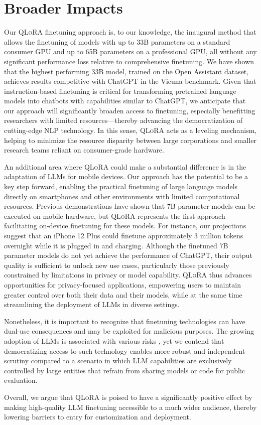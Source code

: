 \section{Broader Impacts}

Our \textsc{QLoRA} finetuning approach is, to our knowledge, the inaugural method that allows the finetuning of models with up to 33B parameters on a standard consumer GPU and up to 65B parameters on a professional GPU, all without any significant performance loss relative to comprehensive finetuning. We have shown that the highest performing 33B model, trained on the Open Assistant dataset, achieves results competitive with ChatGPT in the Vicuna benchmark. Given that instruction-based finetuning is critical for transforming pretrained language models into chatbots with capabilities similar to ChatGPT, we anticipate that our approach will significantly broaden access to finetuning, especially benefitting researchers with limited resources—thereby advancing the democratization of cutting-edge NLP technology. In this sense, \textsc{QLoRA} acts as a leveling mechanism, helping to minimize the resource disparity between large corporations and smaller research teams reliant on consumer-grade hardware.

An additional area where \textsc{QLoRA} could make a substantial difference is in the adaptation of LLMs for mobile devices. Our approach has the potential to be a key step forward, enabling the practical finetuning of large language models directly on smartphones and other environments with limited computational resources. Previous demonstrations have shown that 7B parameter models can be executed on mobile hardware, but \textsc{QLoRA} represents the first approach facilitating on-device finetuning for these models. For instance, our projections suggest that an iPhone 12 Plus could finetune approximately 3 million tokens overnight while it is plugged in and charging. Although the finetuned 7B parameter models do not yet achieve the performance of ChatGPT, their output quality is sufficient to unlock new use cases, particularly those previously constrained by limitations in privacy or model capability. \textsc{QLoRA} thus advances opportunities for privacy-focused applications, empowering users to maintain greater control over both their data and their models, while at the same time streamlining the deployment of LLMs in diverse settings.

Nonetheless, it is important to recognize that finetuning technologies can have dual-use consequences and may be exploited for malicious purposes. The growing adoption of LLMs is associated with various risks \citep{bommasani2021opportunities,bender2021dangers}, yet we contend that democratizing access to such technology enables more robust and independent scrutiny compared to a scenario in which LLM capabilities are exclusively controlled by large entities that refrain from sharing models or code for public evaluation.

Overall, we argue that \textsc{QLoRA} is poised to have a significantly positive effect by making high-quality LLM finetuning accessible to a much wider audience, thereby lowering barriers to entry for customization and deployment.